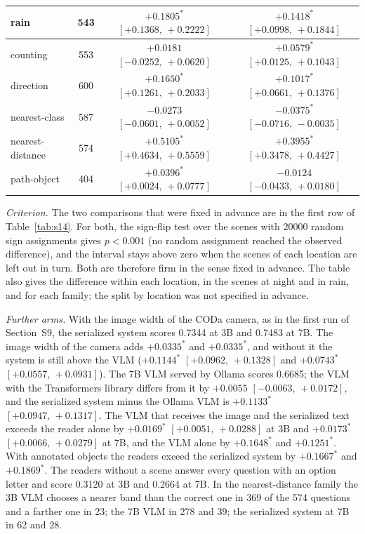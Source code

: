\documentclass[10pt]{article}
\begin{document}
\begin{table}[h]
\begin{tabular}{@{}lccc@{}}
rain & 543 & $+0.1805^{*}$ $[+0.1368,\,+0.2222]$ & $+0.1418^{*}$ $[+0.0998,\,+0.1844]$ \\ \midrule
counting & 553 & $+0.0181$ $[-0.0252,\,+0.0620]$ & $+0.0579^{*}$ $[+0.0125,\,+0.1043]$ \\
direction & 600 & $+0.1650^{*}$ $[+0.1261,\,+0.2033]$ & $+0.1017^{*}$ $[+0.0661,\,+0.1376]$ \\
nearest-class & 587 & $-0.0273$ $[-0.0601,\,+0.0052]$ & $-0.0375^{*}$ $[-0.0716,\,-0.0035]$ \\
nearest-distance & 574 & $+0.5105^{*}$ $[+0.4634,\,+0.5559]$ & $+0.3955^{*}$ $[+0.3478,\,+0.4427]$ \\
path-object & 404 & $+0.0396^{*}$ $[+0.0024,\,+0.0777]$ & $-0.0124$ $[-0.0433,\,+0.0180]$ \\
\bottomrule
\end{tabular}
\end{table}

\emph{Criterion.} The two comparisons that were fixed in advance are in the first row of Table~\ref{tab:s14}. For both, the sign-flip test over the scenes with 20000 random sign assignments gives $p<0.001$ (no random assignment reached the observed difference), and the interval stays above zero when the scenes of each location are left out in turn. Both are therefore firm in the sense fixed in advance. The table also gives the difference within each location, in the scenes at night and in rain, and for each family; the split by location was not specified in advance.

\emph{Further arms.} With the image width of the CODa camera, as in the first run of Section~S9, the serialized system scores 0.7344 at 3B and 0.7483 at 7B. The image width of the camera adds $+0.0335^{*}$ and $+0.0335^{*}$, and without it the system is still above the VLM ($+0.1144^{*}$ $[+0.0962,\,+0.1328]$ and $+0.0743^{*}$ $[+0.0557,\,+0.0931]$). The 7B VLM served by Ollama scores 0.6685; the VLM with the Transformers library differs from it by $+0.0055$ $[-0.0063,\,+0.0172]$, and the serialized system minus the Ollama VLM is $+0.1133^{*}$ $[+0.0947,\,+0.1317]$. The VLM that receives the image and the serialized text exceeds the reader alone by $+0.0169^{*}$ $[+0.0051,\,+0.0288]$ at 3B and $+0.0173^{*}$ $[+0.0066,\,+0.0279]$ at 7B, and the VLM alone by $+0.1648^{*}$ and $+0.1251^{*}$. With annotated objects the readers exceed the serialized system by $+0.1667^{*}$ and $+0.1869^{*}$. The readers without a scene answer every question with an option letter and score 0.3120 at 3B and 0.2664 at 7B. In the nearest-distance family the 3B VLM chooses a nearer band than the correct one in 369 of the 574 questions and a farther one in 23; the 7B VLM in 278 and 39; the serialized system at 7B in 62 and 28.
\end{document}
